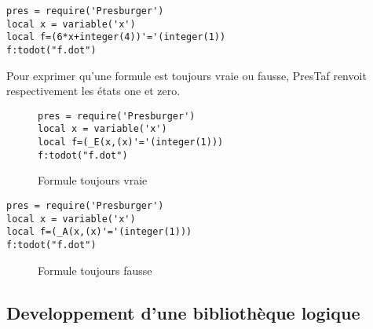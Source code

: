 \begin{lstlisting}[mathescape=true, frame=single]
pres = require('Presburger')
local x = variable('x')
local f=(6*x+integer(4))'='(integer(1))
f:todot("f.dot")
\end{lstlisting}

Pour exprimer qu'une formule est toujours vraie ou fausse, PresTaf renvoit respectivement les états one et zero.
\begin{figure}[h]
\begin{lstlisting}[mathescape=true, frame=single]
pres = require('Presburger')
local x = variable('x')
local f=(_E(x,(x)'='(integer(1)))
f:todot("f.dot")
\end{lstlisting}

\caption{Formule toujours vraie}
\end{figure}


\begin{lstlisting}[mathescape=true, frame=single]
pres = require('Presburger')
local x = variable('x')
local f=(_A(x,(x)'='(integer(1)))
f:todot("f.dot")
\end{lstlisting}

\begin{figure}[h]
\caption{Formule toujours fausse}
\end{figure}

\subsection{ Developpement d’une bibliothèque logique}

